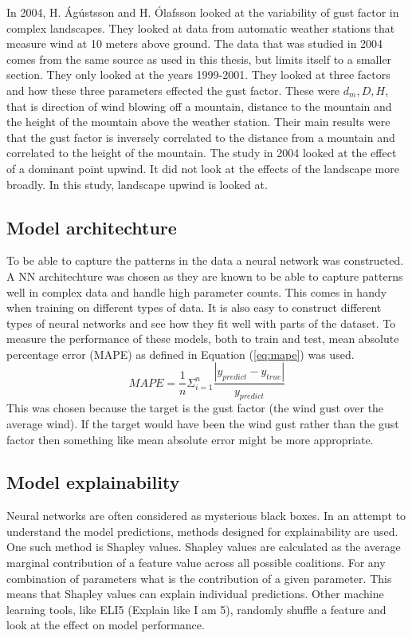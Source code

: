 In 2004, H. Ágústsson and H. Ólafsson\cite{mean_gust_HA_HO} looked at the variability of gust factor in complex landscapes. They looked at data from automatic weather stations that measure wind at 10 meters above ground. The data that was studied in 2004 comes from the same source as used in this thesis, but limits itself to a smaller section. They only looked at the years 1999-2001. They looked at three factors and how these three parameters effected the gust factor. These were $d_m, D, H$, that is direction of wind blowing off a mountain, distance to the mountain and the height of the mountain above the weather station. Their main results were that the gust factor is inversely correlated to the distance from a mountain and correlated to the height of the mountain. The study in 2004 looked at the effect of a dominant point upwind. It did not look at the effects of the landscape more broadly. In this study, landscape upwind is looked at.

\subsection{Model architechture}
To be able to capture the patterns in the data a neural network was constructed. A NN architechture was chosen as they are known to be able to capture patterns well in complex data and handle high parameter counts. This comes in handy when training on different types of data. It is also easy to construct different types of neural networks and see how they fit well with parts of the dataset. To measure the performance of these models, both to train and test, mean absolute percentage error (MAPE) as defined in Equation (\ref{eq:mape}) was used.
\begin{equation}
    \label{eq:mape}
    MAPE = \frac{1}{n}\Sigma_{i=1}^n\frac{|y_{predict} - y_{true}|}{y_{predict}}
\end{equation}
This was chosen because the target is the gust factor (the wind gust over the average wind). If the target would have been the wind gust rather than the gust factor then something like mean absolute error might be more appropriate.

\subsection{Model explainability}
Neural networks are often considered as mysterious black boxes\cite{nn_black_box}. In an attempt to understand the model predictions, methods designed for explainability are used. One such method is Shapley values\cite{shapley_information}. Shapley values are calculated as the average marginal contribution of a feature value across all possible coalitions. For any combination of parameters what is the contribution of a given parameter. This means that Shapley values can explain individual predictions. Other machine learning tools, like ELI5 (Explain like I am 5), randomly shuffle a feature and look at the effect on model performance\cite{eli5_information}.
